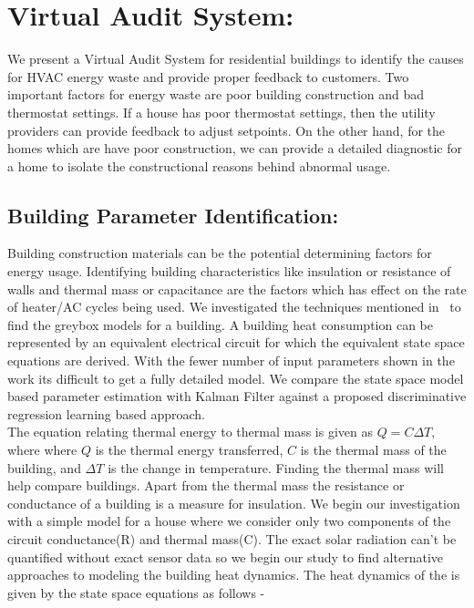 
\section{Virtual Audit System:}

\indent We present a Virtual Audit System for residential buildings to identify the causes for HVAC energy waste and provide proper feedback to customers. Two important factors for energy waste are poor building construction and bad thermostat settings. If a house has poor thermostat settings, then the utility providers can provide feedback to adjust setpoints. On the other hand, for the homes which are have poor construction, we can provide a detailed diagnostic for a home to isolate the constructional reasons behind abnormal usage.

\subsection{Building Parameter Identification:} 

 \indent Building construction materials can be the potential determining factors for energy usage. Identifying building characteristics like insulation or resistance of walls and thermal mass or capacitance are the factors which has effect on the rate of heater/AC cycles being used. We investigated the techniques mentioned in~\cite{building} to find the greybox models for a building. A building heat consumption can be represented by an equivalent electrical circuit for which the equivalent state space equations are derived. With the fewer number of input parameters shown in the work its difficult to get a fully detailed model. We compare the state space model based parameter estimation with Kalman Filter against a proposed discriminative regression learning based approach.\\
 \indent The equation relating thermal energy to thermal mass is given as $Q = C \Delta T$, where where $Q$ is the thermal energy transferred, $C$ is the thermal mass of the building, and $\Delta T$ is the change in temperature. Finding the thermal mass will help compare buildings. Apart from the thermal mass the resistance or conductance of a building is a measure for insulation. We begin our investigation with a simple model for a house where we consider only two components of the circuit conductance(R) and thermal mass(C). The exact solar radiation can't be quantified without exact sensor data so we begin our study to find alternative approaches to modeling the building heat dynamics. The heat dynamics of the is given by the state space equations as follows - 
 
